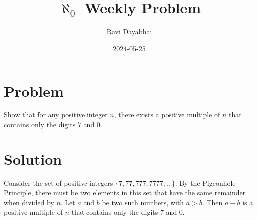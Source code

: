 \documentclass{article}
\title{$\aleph_{0}$ Weekly Problem}
\author{Ravi Dayabhai}
\date{2024-05-25}
\begin{document}
\maketitle

\section*{Problem}

Show that for any positive integer $n$, there exists a positive multiple of $n$ that contains only the digits $7$ and $0$.

\section*{Solution}


Consider the set of positive integers $\lbrace 7, 77, 777, 7777, \ldots \rbrace$. 
By the Pigeonhole Principle, there must be two elements in this set that have the same remainder when divided by $n$. 
Let $a$ and $b$ be two such numbers, with $a > b$. Then $a - b$ is a positive multiple of $n$ that contains only the digits $7$ and $0$.
\end{document}
